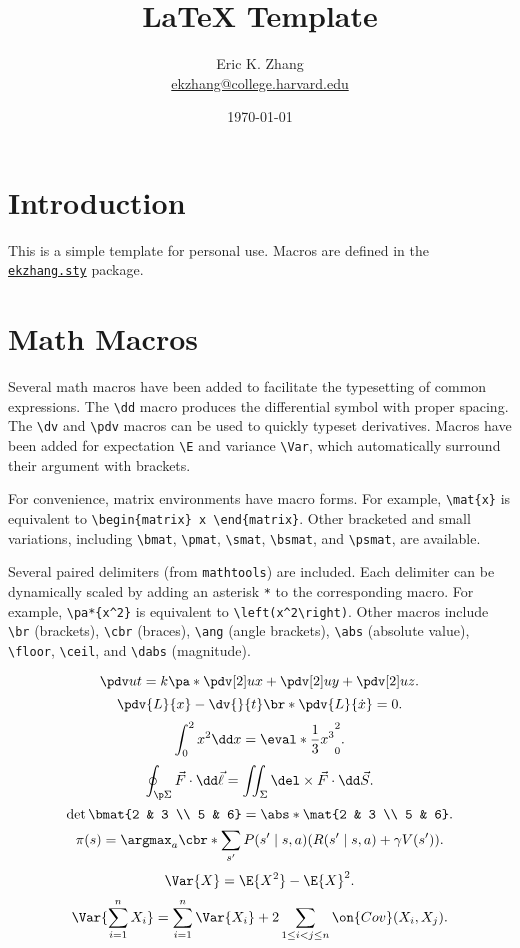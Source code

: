 \documentclass[11pt]{article}
\title{\LaTeX{} Template}
\author{Eric K. Zhang\\
\href{mailto:ekzhang@college.harvard.edu}{ekzhang@college.harvard.edu}}
\date{\today}
\begin{document}
\maketitle

\section{Introduction}
\label{sec:intro}
This is a simple template for personal use. Macros are defined in the \href{run:./ekzhang.sty}{\texttt{ekzhang.sty}} package.

\section{Math Macros}
Several math macros have been added to facilitate the typesetting of common expressions. The \verb|\dd| macro produces the differential symbol with proper spacing. The \verb|\dv| and \verb|\pdv| macros can be used to quickly typeset derivatives. Macros have been added for expectation \verb|\E| and variance \verb|\Var|, which automatically surround their argument with brackets.

For convenience, matrix environments have macro forms. For example, \verb|\mat{x}| is equivalent to \verb|\begin{matrix} x \end{matrix}|. Other bracketed and small variations, including \verb|\bmat|, \verb|\pmat|, \verb|\smat|, \verb|\bsmat|, and \verb|\psmat|, are available.

Several paired delimiters (from \verb|mathtools|) are included. Each delimiter can be dynamically scaled by adding an asterisk \verb|*| to the corresponding macro. For example, \verb|\pa*{x^2}| is equivalent to \verb|\left(x^2\right)|. Other macros include \verb|\br| (brackets), \verb|\cbr| (braces), \verb|\ang| (angle brackets), \verb|\abs| (absolute value), \verb|\floor|, \verb|\ceil|, and \verb|\dabs| (magnitude).

\[ \pdv ut = k\pa*{\pdv[2] ux + \pdv[2] uy + \pdv[2] uz}. \]
\[ \pdv{L}{x} - \dv{}{t}\br*{\pdv{L}{\dot x}} = 0. \]
\[ \int_0^2 x^2 \dd x = \eval*{\frac 13 x^3}_0^2. \]
\[ \oint_{\p\Sigma} \vec F \cdot \dd \vec\ell = \iint_{\Sigma} \del \times \vec F \cdot \dd \vec S. \]
\[ \det \bmat{2 & 3 \\ 5 & 6} = \abs*{\mat{2 & 3 \\ 5 & 6}}. \]
\[ \pi(s) = \argmax_a \cbr*{\sum_{s'} P(s' \mid s, a) (R(s' \mid s, a) + \gamma V(s'))}. \]
\[ \Var{X} = \E{X^2} - \E{X}^2. \]
\[ \Var{\sum_{i=1}^n X_i} = \sum_{i=1}^n \Var{X_i} + 2\sum_{1 \leq i < j \leq n} \on{Cov}(X_i, X_j). \]
\end{document}
